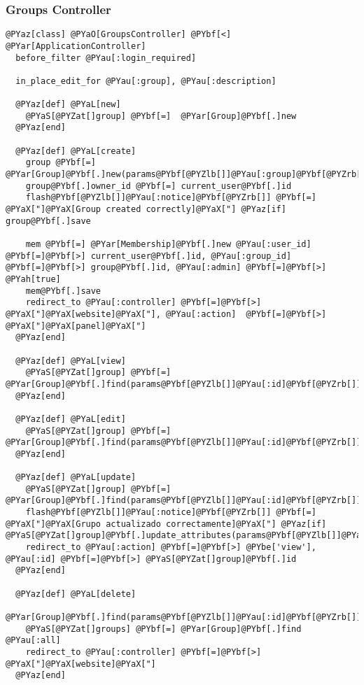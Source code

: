 
\subsubsection{Groups Controller} %
\label{ssub:groups_controller}

\begin{Verbatim}[commandchars=@\[\]]
@PYaz[class] @PYaO[GroupsController] @PYbf[<] @PYar[ApplicationController]
  before_filter @PYau[:login_required]
  
  in_place_edit_for @PYau[:group], @PYau[:description]
  
  @PYaz[def] @PYaL[new]
    @PYaS[@PYZat[]group] @PYbf[=]  @PYar[Group]@PYbf[.]new
  @PYaz[end]
  
  @PYaz[def] @PYaL[create]
    group @PYbf[=] @PYar[Group]@PYbf[.]new(params@PYbf[@PYZlb[]]@PYau[:group]@PYbf[@PYZrb[]])
    group@PYbf[.]owner_id @PYbf[=] current_user@PYbf[.]id
    flash@PYbf[@PYZlb[]]@PYau[:notice]@PYbf[@PYZrb[]] @PYbf[=] @PYaX["]@PYaX[Group created correctly]@PYaX["] @PYaz[if] group@PYbf[.]save
    
    mem @PYbf[=] @PYar[Membership]@PYbf[.]new @PYau[:user_id] @PYbf[=]@PYbf[>] current_user@PYbf[.]id, @PYau[:group_id] @PYbf[=]@PYbf[>] group@PYbf[.]id, @PYau[:admin] @PYbf[=]@PYbf[>] @PYah[true]
    mem@PYbf[.]save
    redirect_to @PYau[:controller] @PYbf[=]@PYbf[>] @PYaX["]@PYaX[website]@PYaX["], @PYau[:action]  @PYbf[=]@PYbf[>] @PYaX["]@PYaX[panel]@PYaX["]
  @PYaz[end]

  @PYaz[def] @PYaL[view]
    @PYaS[@PYZat[]group] @PYbf[=] @PYar[Group]@PYbf[.]find(params@PYbf[@PYZlb[]]@PYau[:id]@PYbf[@PYZrb[]])
  @PYaz[end]
  
  @PYaz[def] @PYaL[edit]
    @PYaS[@PYZat[]group] @PYbf[=] @PYar[Group]@PYbf[.]find(params@PYbf[@PYZlb[]]@PYau[:id]@PYbf[@PYZrb[]])
  @PYaz[end]
  
  @PYaz[def] @PYaL[update]
    @PYaS[@PYZat[]group] @PYbf[=] @PYar[Group]@PYbf[.]find(params@PYbf[@PYZlb[]]@PYau[:id]@PYbf[@PYZrb[]])
    flash@PYbf[@PYZlb[]]@PYau[:notice]@PYbf[@PYZrb[]] @PYbf[=] @PYaX["]@PYaX[Grupo actualizado correctamente]@PYaX["] @PYaz[if] @PYaS[@PYZat[]group]@PYbf[.]update_attributes(params@PYbf[@PYZlb[]]@PYau[:group]@PYbf[@PYZrb[]])
    redirect_to @PYau[:action] @PYbf[=]@PYbf[>] @PYbe['view'], @PYau[:id] @PYbf[=]@PYbf[>] @PYaS[@PYZat[]group]@PYbf[.]id
  @PYaz[end]
  
  @PYaz[def] @PYaL[delete]
    @PYar[Group]@PYbf[.]find(params@PYbf[@PYZlb[]]@PYau[:id]@PYbf[@PYZrb[]])@PYbf[.]destroy
    @PYaS[@PYZat[]groups] @PYbf[=] @PYar[Group]@PYbf[.]find @PYau[:all]
    redirect_to @PYau[:controller] @PYbf[=]@PYbf[>] @PYaX["]@PYaX[website]@PYaX["]
  @PYaz[end]
  

\end{Verbatim}
